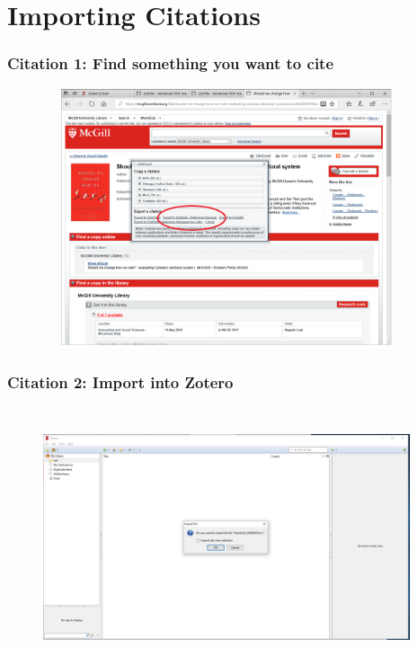 \documentclass[12pt]{beamer}
\begin{document}
\section{Importing Citations}

\begin{frame} \frametitle{Citation 1: Find something you want to cite} \begin{figure}[!h] \centering
	\includegraphics[height=3in, width = 4.25in,keepaspectratio]{zotero/citation_1.png}
\end{figure} \end{frame}

\begin{frame} \frametitle{Citation 2: Import into Zotero} \begin{figure}[!h] \centering
	\includegraphics[height=3in, width = 4.25in,keepaspectratio]{zotero/citation_2.png}
\end{figure} \end{frame}
\end{document}
